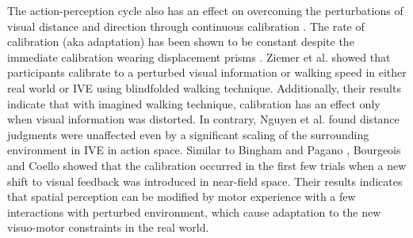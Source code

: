 The action-perception cycle also has an effect on overcoming the perturbations of visual distance and direction through continuous calibration \cite{BR99,BC12,ZBC+13}. The rate of calibration (aka adaptation) has been shown to be constant despite the immediate calibration wearing displacement prisms \cite{BR99}. Ziemer et al. \cite{ZBC+13} showed that participants calibrate to a perturbed visual information or walking speed in either real world or IVE using blindfolded walking technique. Additionally, their results indicate that with imagined walking technique, calibration has an effect only when visual information was distorted. In contrary, Nguyen et al. \cite{NZG+11} found distance judgments were unaffected even by a significant scaling of the surrounding environment in IVE in action space. Similar to Bingham and Pagano \cite{BP98}, Bourgeois and Coello \cite{BC12} showed that the calibration occurred in the first few trials when a new shift to visual feedback was introduced in near-field space. Their results indicates that spatial perception can be modified by motor experience with a few interactions with perturbed environment, which cause adaptation to the new visuo-motor constraints in the real world. %


